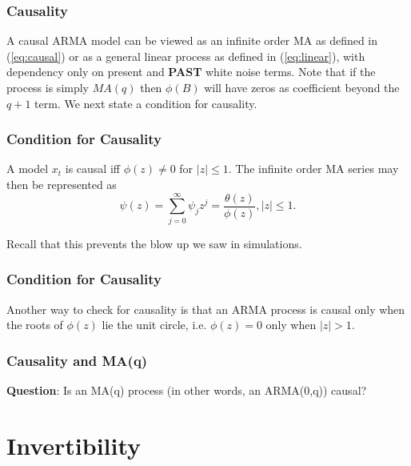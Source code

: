 \documentclass[%
xcolor=pdftex]{beamer}
\begin{document}
\begin{frame}
\frametitle{Causality}

A causal ARMA model can be viewed as an infinite order MA as defined in (\ref{eq:causal}) or as a general linear process as defined in (\ref{eq:linear}), with dependency
only on present and \textbf{PAST} white noise terms.   Note that if the process is
simply $MA(q)$ then $\phi(B)$ will have zeros as coefficient
beyond the $q+1$ term. We next state a condition for causality.


\end{frame}

\begin{frame}
\frametitle{Condition for Causality}

A model $x_t$ is causal iff  $\phi(z)\neq 0$ for $|z| \leq 1$.  The infinite order MA series may then be represented as
\begin{equation} \label{eq:causal_rep}
\psi(z)=\sum_{j=0}^\infty \psi_j z^j=\frac{\theta(z)}{\phi(z)},  |z| \leq 1.
\end{equation}

Recall that this prevents the blow up we saw in simulations.

\end{frame}

\begin{frame}
\frametitle{Condition for Causality}

Another way to check for causality is that an ARMA process is causal only when the roots of $\phi(z)$ lie \underline{\hspace{13 mm}} the unit circle, i.e. $\phi(z)=0$ only when $|z| > 1$.

\end{frame}

\begin{frame}
\frametitle{Causality and MA(q)}

\textbf{Question}: Is an MA(q) process (in other words, an ARMA(0,q)) causal?

\vspace{40mm}

\end{frame}

\section{Invertibility}
\frame{\tableofcontents[currentsection]}
\end{document}
